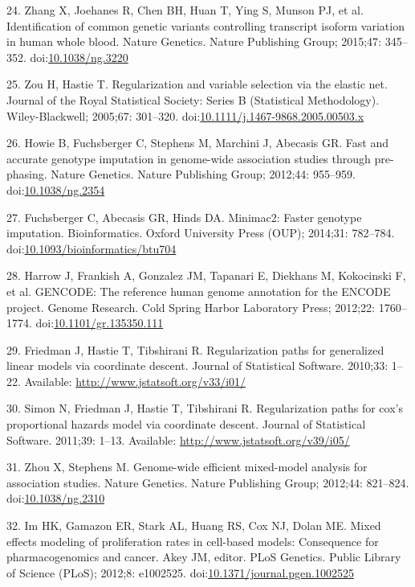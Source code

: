 \documentclass[]{article}
\begin{document}
24. Zhang X, Joehanes R, Chen BH, Huan T, Ying S, Munson PJ, et al.
Identification of common genetic variants controlling transcript isoform
variation in human whole blood. Nature Genetics. Nature Publishing
Group; 2015;47: 345--352.
doi:\href{http://dx.doi.org/10.1038/ng.3220}{10.1038/ng.3220}

25. Zou H, Hastie T. Regularization and variable selection via the
elastic net. Journal of the Royal Statistical Society: Series B
(Statistical Methodology). Wiley-Blackwell; 2005;67: 301--320.
doi:\href{http://dx.doi.org/10.1111/j.1467-9868.2005.00503.x}{10.1111/j.1467-9868.2005.00503.x}

26. Howie B, Fuchsberger C, Stephens M, Marchini J, Abecasis GR. Fast
and accurate genotype imputation in genome-wide association studies
through pre-phasing. Nature Genetics. Nature Publishing Group; 2012;44:
955--959. doi:\href{http://dx.doi.org/10.1038/ng.2354}{10.1038/ng.2354}

27. Fuchsberger C, Abecasis GR, Hinds DA. Minimac2: Faster genotype
imputation. Bioinformatics. Oxford University Press (OUP); 2014;31:
782--784.
doi:\href{http://dx.doi.org/10.1093/bioinformatics/btu704}{10.1093/bioinformatics/btu704}

28. Harrow J, Frankish A, Gonzalez JM, Tapanari E, Diekhans M,
Kokocinski F, et al. GENCODE: The reference human genome annotation for
the ENCODE project. Genome Research. Cold Spring Harbor Laboratory
Press; 2012;22: 1760--1774.
doi:\href{http://dx.doi.org/10.1101/gr.135350.111}{10.1101/gr.135350.111}

29. Friedman J, Hastie T, Tibshirani R. Regularization paths for
generalized linear models via coordinate descent. Journal of Statistical
Software. 2010;33: 1--22. Available:
\url{http://www.jstatsoft.org/v33/i01/}

30. Simon N, Friedman J, Hastie T, Tibshirani R. Regularization paths
for cox's proportional hazards model via coordinate descent. Journal of
Statistical Software. 2011;39: 1--13. Available:
\url{http://www.jstatsoft.org/v39/i05/}

31. Zhou X, Stephens M. Genome-wide efficient mixed-model analysis for
association studies. Nature Genetics. Nature Publishing Group; 2012;44:
821--824. doi:\href{http://dx.doi.org/10.1038/ng.2310}{10.1038/ng.2310}

32. Im HK, Gamazon ER, Stark AL, Huang RS, Cox NJ, Dolan ME. Mixed
effects modeling of proliferation rates in cell-based models:
Consequence for pharmacogenomics and cancer. Akey JM, editor. PLoS
Genetics. Public Library of Science (PLoS); 2012;8: e1002525.
doi:\href{http://dx.doi.org/10.1371/journal.pgen.1002525}{10.1371/journal.pgen.1002525}
\end{document}
